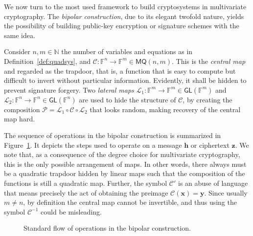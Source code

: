 \documentclass[12pt, a4paper, oneside]{memoir}
\theoremstyle{definition}
\begin{document}
We now turn to the most used framework to build cryptosystems in multivariate cryptography. The \emph{bipolar construction}, due to its elegant twofold nature, yields the possibility of building public-key encryption or signature schemes with the same idea.

Consider $n, m \in \mathbb{N}$ the number of variables and equations as in Definition~\ref{def:quadsys}, and $\mathcal{C} : \mathbb{F}^{n} \to \mathbb{F}^{m} \in \mathsf{MQ}(n, m)$. This is the \emph{central map} and regarded as the trapdoor, that is, a function that is easy to compute but difficult to invert without particular information. Evidently, it shall be hidden to prevent signature forgery. Two \emph{lateral maps} $\mathcal{L}_{1} : \mathbb{F}^{m} \to \mathbb{F}^{m} \in \mathsf{GL}(\mathbb{F}^{m})$ and $\mathcal{L}_{2} : \mathbb{F}^{n} \to \mathbb{F}^{n} \in \mathsf{GL}(\mathbb{F}^{n})$ are used to hide the structure of $\mathcal{C}$, by creating the composition $\mathcal{P} = \mathcal{L}_{1} \circ \mathcal{C} \circ \mathcal{L}_{2}$ that looks random, making recovery of the central map hard. 

The sequence of operations in the bipolar construction is summarized in Figure~\ref{fig:bipolar}. It depicts the steps used to operate on a message $\mathbf{h}$ or ciphertext $\mathbf{z}$. We note that, as a consequence of the degree choice for multivariate cryptography, this is the only possible arrangement of maps. In other words, there always must be a quadratic trapdoor hidden by linear maps such that the composition of the functions is still a quadratic map. Further, the symbol $\mathcal{C}'$ is an abuse of language that means precisely the act of obtaining the preimage $\mathcal{C}(\mathbf{x}) = \mathbf{y}$. Since usually $m \neq n$, by definition the central map cannot be invertible, and thus using the symbol $\mathcal{C}^{-1}$ could be misleading.

\begin{figure}[htbp]
  \centering
  \caption{Standard flow of operations in the bipolar
    construction.}\label{fig:bipolar}
\end{figure}
\end{document}
